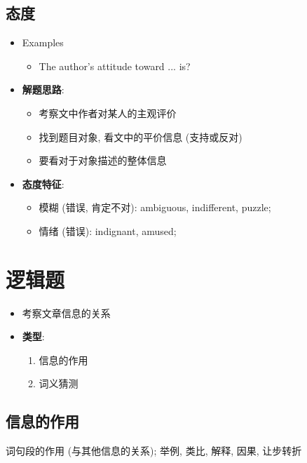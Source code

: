   \subsection{态度}

    \begin{itemize}
      \item Examples
      \begin{itemize}
        \item The author’s attitude toward ... is?
      \end{itemize}

      \item \textbf{解题思路}:
      \begin{itemize}
        \item 考察文中作者对某人的主观评价
        \item 找到题目对象, 看文中的平价信息 (支持或反对)
        \item 要看对于对象描述的整体信息
      \end{itemize}

      \item \textbf{态度特征}:
      \begin{itemize}
        \item 模糊 (错误, 肯定不对): ambiguous, indifferent, puzzle;
        \item 情绪 (错误): indignant, amused;
      \end{itemize}
    \end{itemize}

\section{逻辑题}

  \begin{itemize}
    \item 考察文章信息的关系
    \item \textbf{类型}:
    \begin{enumerate}
      \item 信息的作用
      \item 词义猜测
    \end{enumerate}
  \end{itemize}

  \subsection{信息的作用}

    词句段的作用 (与其他信息的关系); 举例, 类比, 解释, 因果, 让步转折

